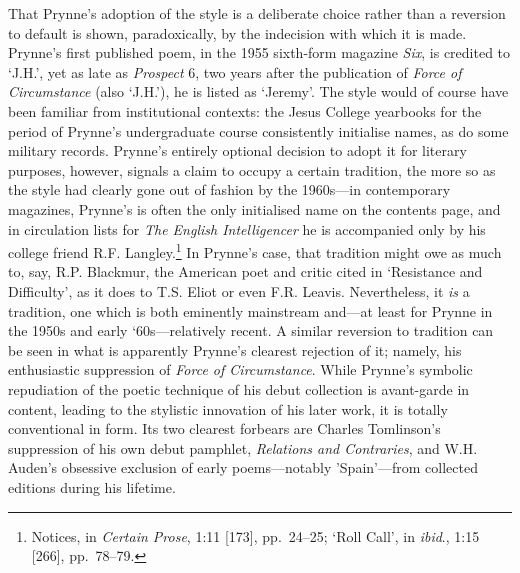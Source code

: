 \documentclass[]{article}
\begin{document}
\noindent That Prynne’s adoption of the style is a deliberate choice
rather than a reversion to default is shown, paradoxically, by the
indecision with which it is made. Prynne’s first published poem, in the
1955 sixth-form magazine \emph{Six}, is credited to ‘J.H.’, yet as late
as \emph{Prospect} 6, two years after the publication of \emph{Force of
Circumstance} (also ‘J.H.’), he is listed as ‘Jeremy’. The style would
of course have been familiar from institutional contexts: the Jesus
College yearbooks for the period of Prynne’s undergraduate course
consistently initialise names, as do some military records. Prynne’s
entirely optional decision to adopt it for literary purposes, however,
signals a claim to occupy a certain tradition, the more so as the style
had clearly gone out of fashion by the 1960s—in contemporary magazines,
Prynne’s is often the only initialised name on the contents page, and in
circulation lists for \emph{The English Intelligencer} he is accompanied
only by his college friend R.F. Langley.\footnote{Notices, in
  \emph{Certain Prose}, 1:11 {[}173{]}, pp.~24–25; ‘Roll Call’, in
  \emph{ibid}., 1:15 {[}266{]}, pp.~78–79.} In Prynne’s case, that
tradition might owe as much to, say, R.P. Blackmur, the American poet
and critic cited in ‘Resistance and Difficulty’, as it does to T.S.
Eliot or even F.R. Leavis. Nevertheless, it \emph{is} a tradition, one
which is both eminently mainstream and—at least for Prynne in the 1950s
and early ‘60s—relatively recent. A similar reversion to tradition can
be seen in what is apparently Prynne’s clearest rejection of it; namely,
his enthusiastic suppression of \emph{Force of Circumstance}. While
Prynne’s symbolic repudiation of the poetic technique of his debut
collection is avant-garde in content, leading to the stylistic
innovation of his later work, it is totally conventional in form. Its
two clearest forbears are Charles Tomlinson’s suppression of his own
debut pamphlet, \emph{Relations and Contraries}, and W.H. Auden’s
obsessive exclusion of early poems—notably ’Spain’—from collected
editions during his lifetime.
\end{document}
